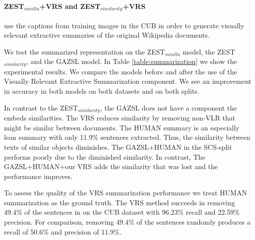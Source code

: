 \documentclass[11pt,a4paper]{article}
\newcommand\reut[1]{\textcolor{green}{\textbf{REUT:} #1 }}
\begin{document}
\paragraph{ ZEST$_{vanilla}$+VRS and ZEST$_{similarity}$+VRS }
use the captions from training images in the CUB in order to generate visually relevant extractive summaries of the original Wikipedia documents.

We test the summarized representation on the ZEST$_{vanilla}$ model, the ZEST$_{similarity}$, and the GAZSL \citep{zhu2018generative} model. In Table \ref{table:summarization} we show the experimental results. We compare the models before and after the use of the Visually Relevant Extractive Summarization component. We see an improvement in accuracy in both models on both datasets and on both splits. 

In contrast to the ZEST$_{similarity}$, the GAZSL does not have a component the embeds similarities. The VRS reduces similarity by removing non-VLR that might be similar between documents. 
The HUMAN summary is an especially lean summary with only 11.9\% sentences extracted. Thus, the similarity between texts of similar objects diminishes. The GAZSL+HUMAN in the SCS-split performs poorly due to the diminished similarity. In contrast, The GAZSL+HUMAN+our VRS adds the similarity that was lost and the performance improves.



To assess the quality of the VRS summarization performance we treat HUMAN summarization as the ground truth. The VRS method succeeds in removing 49.4\% of the sentences in on the CUB dataset with 96.23\% recall and 22.59\% precision. For comparison, removing 49.4\% of the sentences randomly produces a recall of 50.6\% and precision of 11.9\%.
\end{document}
